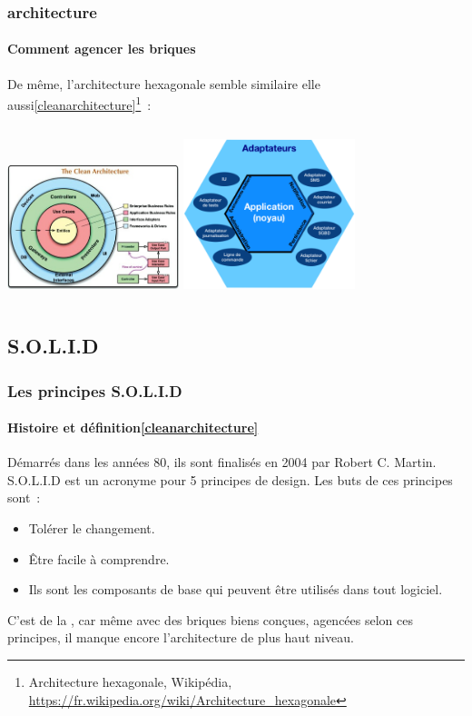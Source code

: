 \documentclass{beamer}
\begin{document}
    \begin{frame}
        \transdissolve
        \frametitle{ architecture}
        \framesubtitle{Comment agencer les briques}
        De même, l'architecture hexagonale semble similaire elle aussi\cref{cleanarchitecture}\footnotestep\footnote{Architecture hexagonale, Wikipédia, \url{https://fr.wikipedia.org/wiki/Architecture_hexagonale}}~:
        \bigbreak
        \begin{columns}
            \centering
            \includegraphics[width=5cm]{image/the-clean-architecture}
            \centering
            \includegraphics[width=5cm]{image/hexagonal-architecture}
        \end{columns}
    \end{frame}

    \subsection{S.O.L.I.D}\label{subsec:mid-level-solid}


    \begin{frame}
        \transdissolve
        \frametitle{Les principes S.O.L.I.D}
        \framesubtitle{Histoire et définition\cref{cleanarchitecture}}
        Démarrés dans les années 80, ils sont finalisés en 2004 par Robert C. Martin.
        S.O.L.I.D est un acronyme pour 5 principes de design.
        \bigbreak
        Les buts de ces principes sont~:
        \begin{itemize}
            \item Tolérer le changement.
            \item Être facile à comprendre.
            \item Ils sont les composants de base qui peuvent être utilisés dans tout logiciel.
        \end{itemize}
        \bigbreak
        C'est de la , car même avec des briques biens conçues, agencées selon ces principes, il manque encore l'architecture de plus haut niveau.
    \end{frame}
\end{document}
